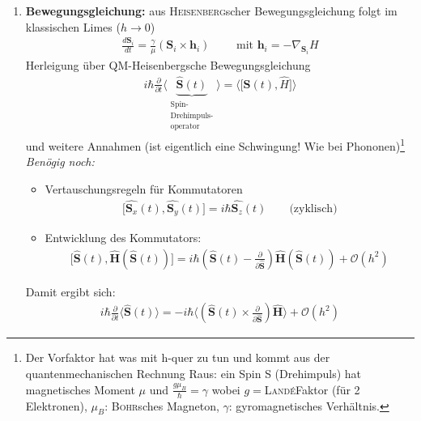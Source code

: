 \documentclass[12pt]{article}
\begin{document}
 \begin{enumerate}
 \item \textbf{Bewegungsgleichung:} aus \textsc{Heisenberg}scher Bewegungsgleichung folgt im klassischen Limes ($h \to 0$)
  \begin{align}
\frac{d \mathbf{S}_i}{dt} = \frac{\gamma}{\mu } ( \mathbf{S}_i \times \mathbf{h}_i ) \qquad \mbox{ mit } \mathbf{h}_i = - \nabla_{\mathbf{S}_i} H
  \end{align}
  Herleigung über QM-Heisenbergsche Bewegungsgleichung
  \begin{align*}
    i \hbar \frac{\partial}{\partial t} \langle \underbrace{\mathbf{\hat{S}}(t)}_{\substack{ \text{Spin-} \\ \text{Drehimpuls-} \\ \text{operator}}} \rangle = \langle \big[ \mathbf{S}(t) ,\hat{H}\big] \rangle
  \end{align*}
  und weitere Annahmen (ist eigentlich eine Schwingung! Wie bei Phononen)\footnote{Der Vorfaktor hat was mit h-quer zu tun und kommt aus der quantenmechanischen Rechnung Raus: ein Spin S (Drehimpuls) hat magnetisches Moment $\mu$ und $\frac{g \mu_B}{\hbar}= \gamma$ wobei $g=$\textsc{Landé}Faktor (für 2 Elektronen), $\mu_B$: \textsc{Bohr}sches Magneton, $\gamma$: gyromagnetisches Verhältnis.} \\
  \textit{Benögig noch:}
  \begin{itemize}
  \item Vertauschungsregeln für Kommutatoren
  \begin{align*}
  \big[ \hat{\mathbf{S}_x} (t), \hat{\mathbf{S}_y} (t) \big] = i \hbar \hat{\mathbf{S}_z} (t) \qquad \text{(zyklisch)}
  \end{align*}
  \item Entwicklung des Kommutators:
  \begin{align*}
  \big[ \hat{\mathbf{S}} (t), \hat{\mathbf{H}}(\hat{\mathbf{S}} (t)) \big] =
  i \hbar \left( \hat{\mathbf{S}}(t) - \frac{\partial}{\partial \hat{\mathbf{S} }}\right) \hat{\mathbf{H}} ( \hat{\mathbf{S}}(t) )+ \mathcal{O} (h^2) 
  \end{align*} %
  \end{itemize}
  Damit ergibt sich: 
  \begin{align*}
  i \hbar \frac{\partial}{\partial t} \langle \hat{\mathbf{S}}(t) \rangle = - i \hbar \langle \left( \hat{\mathbf{S}} (t) \times \frac{\partial}{\partial \hat{\mathbf{S}}} \right) \hat{\mathbf{H}} \rangle + \mathcal{O}(h^2)
  \end{align*}

\end{enumerate}
\end{document}
